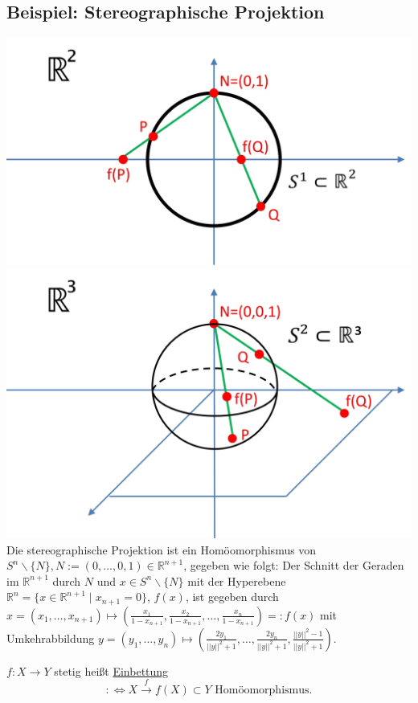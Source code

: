 \documentclass[a4paper,11pt,notitlepage]{report}
\theoremstyle{definition}
\newcommand{\R}{{\ensuremath{\mathbb{R}}}}
\newenvironment{bsp}[1]
{
\setlength{\fboxsep}{10pt}
\subsection*{Beispiel: #1}
\begin{upshape}
}
{
\end{upshape}
}
\newenvironment{definition}[1]{
	\begin{definitions}
	\marginnote{\emph{#1}}
}{\end{definitions}}
\begin{document}
\begin{bsp}{Stereographische Projektion}
	\includegraphics[scale=0.35]{images/Stereographie_S1_R1.png}
	\includegraphics[scale=0.35]{images/Stereographie_S2_R2.png}
	\newline
	Die stereographische Projektion ist ein Homöomorphismus von $S^n \backslash \{N\}, N := (0, \ldots, 0, 1) \in \R^{n+1}$, gegeben wie folgt:
	\newline
	Der Schnitt der Geraden im $\R^{n+1}$ durch $N$ und $x \in S^n \backslash \{N\}$ mit der Hyperebene $\R^n=\{x \in \R^{n+1} \mid x_{n+1} = 0 \}$, $f(x)$, ist gegeben durch $x = (x_1, \ldots, x_{n+1}) \mapsto (\frac{x_1}{1-x_{n+1}}, \frac{x_2}{1-x_{n+1}}, \ldots, \frac{x_n}{1-x_{n+1}}) =: f(x)$ mit Umkehrabbildung $y = (y_1, \ldots, y_n) \mapsto (\frac{2 y_1}{||y||^2+1}, \ldots, \frac{2 y_n}{||y||^2+1},\frac{||y||^2-1}{||y||^2+1})$.
\end{bsp}

\begin{definition}{Einbettung}
	$f \colon X \rightarrow Y$ stetig heißt \underline{Einbettung} $$:\Leftrightarrow X \overset{f}{\rightarrow}f(X) \subset Y \text{ Homöomorphismus.}$$
\end{definition}
\end{document}
